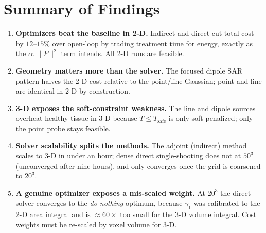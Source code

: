 \section{Summary of Findings}

\begin{enumerate}
    \item \textbf{Optimizers beat the baseline in 2-D.} Indirect and
    direct cut total cost by $12$--$15\%$ over open-loop by trading
    treatment time for energy, exactly as the $\alpha_1\|P\|^2$ term
    intends. All 2-D runs are feasible.
    \item \textbf{Geometry matters more than the solver.} The focused
    dipole SAR pattern halves the 2-D cost relative to the point/line
    Gaussian; point and line are identical in 2-D by construction.
    \item \textbf{3-D exposes the soft-constraint weakness.} The line and
    dipole sources overheat healthy tissue in 3-D because
    $T \leq T_{\text{safe}}$ is only soft-penalized; only the point probe
    stays feasible.
    \item \textbf{Solver scalability splits the methods.} The adjoint
    (indirect) method scales to 3-D in under an hour; dense direct
    single-shooting does not at $50^3$ (unconverged after nine hours), and
    only converges once the grid is coarsened to $20^3$.
    \item \textbf{A genuine optimizer exposes a mis-scaled weight.} At
    $20^3$ the direct solver converges to the \emph{do-nothing} optimum,
    because $\gamma_1$ was calibrated to the 2-D area integral and is
    $\approx 60\times$ too small for the 3-D volume integral. Cost weights
    must be re-scaled by voxel volume for 3-D.
\end{enumerate}
